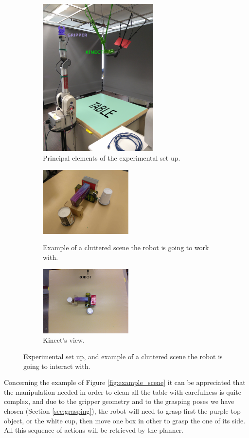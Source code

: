 \begin{figure}[htp]
\centering
\begin{subfigure}[b]{0.4\textwidth}
\includegraphics[height=8cm]{Img/set_up/set_up_nice2.png}
\caption{Principal elements of the experimental set up.}\label{fig:setup_}
\end{subfigure}
\qquad \qquad 
\begin{subfigure}[b]{0.4\textwidth}
\centering
\includegraphics[height=3.5cm]{Img/set_up/example_setup.jpg}
\caption{Example of a cluttered scene the robot is going to work with.}\label{fig:example_scene}
\vspace{2ex}
\includegraphics[height=3.5cm]{Img/set_up/view_kinect.png}
\caption{Kinect's view.}\label{fig:kinect_view}
\end{subfigure}
\caption{Experimental set up, and example of a cluttered scene the robot is going to interact with.}
\label{fig:setup}
\end{figure}


Concerning the example of Figure \ref{fig:example_scene} it can be appreciated that the manipulation needed in order to clean all the table with carefulness is quite complex, and due to the gripper geometry and to the grasping poses we have chosen (Section \ref{sec:grasping}), the robot will need to grasp first the purple top object, or the white cup, then move one box in other to grasp the one of its side. All this sequence of actions will be retrieved by the planner.



